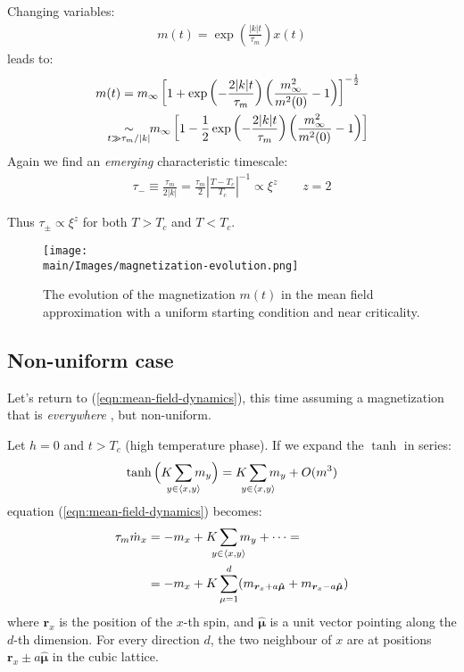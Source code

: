 \documentclass[../../main.tex]{subfiles}
\begin{document}
\begin{itemize}
    Changing variables:
    \begin{align*}
        m(t) = \exp\left(\frac{|k|t}{\tau_m} \right) x(t)
    \end{align*}
    leads to: %
    \begin{align*}
        m(t) &= m_\infty \left[1 + \exp\left(-\frac{2|k|t}{\tau_m} \right) \left(\frac{m^2_\infty}{m^2(0)} - 1 \right)\right]^{-\frac{1}{2}} \\
        &\underset{\mathclap{t \gg \tau_m/|k|}}{\sim} \quad m_\infty \left[1-\frac{1}{2} \exp\left(-\frac{2|k|t}{\tau_m} \right)\left(\frac{m^2_\infty}{m^2(0)} -1\right) \right]
    \end{align*}
    Again we find an \textit{emerging} characteristic timescale:
    \begin{align*}
        \tau_- \equiv \frac{\tau_m}{2|k|} = \frac{\tau_m}{2} \left|\frac{T-T_c}{T_c}  \right|^{-1} \propto \xi^z \qquad z=2
    \end{align*} 
    
    Thus $\tau_\pm \propto \xi^z$ for both $T > T_c$ and $T < T_c$. 
\end{itemize}

\begin{figure}[H]
    \centering
    \texttt{[image: \\main/Images/magnetization-evolution.png]}
    \caption{The evolution of the magnetization $m(t)$ in the mean field approximation with a uniform starting condition and near criticality.}
    \label{fig:magnetization-evolution}
\end{figure}

\subsection{Non-uniform case}
Let's return to (\ref{eqn:mean-field-dynamics}), this time assuming a magnetization that is \textit{everywhere }, but non-uniform.

Let $h=0$ and $t > T_c$ (high temperature phase). If we expand the $\tanh$ in series:
\begin{align*}
    \tanh \Big(K \sum_{\mathclap{y \in \langle x,y \rangle}} m_y\Big) = K \sum_{\mathclap{y \in \langle x,y \rangle}} m_y + O(m^3)
\end{align*}
equation (\ref{eqn:mean-field-dynamics}) becomes:
\begin{align}\nonumber
    \tau_m \dot{m}_x &= - m_x + K \sum_{\mathclap{y \in \langle x,y \rangle}} m_y + \dots =\\
    &= -m_x + K \sum_{\mu=1}^d (m_{\bm{r}_x + a \bm{\hat{\mu}}} + m_{\bm{r}_x - a \bm{\hat{\mu}}}) \label{eqn:non-uniform-evolution}
\end{align}
where $\bm{r}_x$ is the position of the $x$-th spin, and $\bm{\hat{\mu}}$ is a unit vector pointing along the $d$-th dimension. For every direction $d$, the two neighbour of $x$ are at positions $\bm{r}_x \pm a \bm{\hat{\mu}}$ in the cubic lattice.
\end{document}
